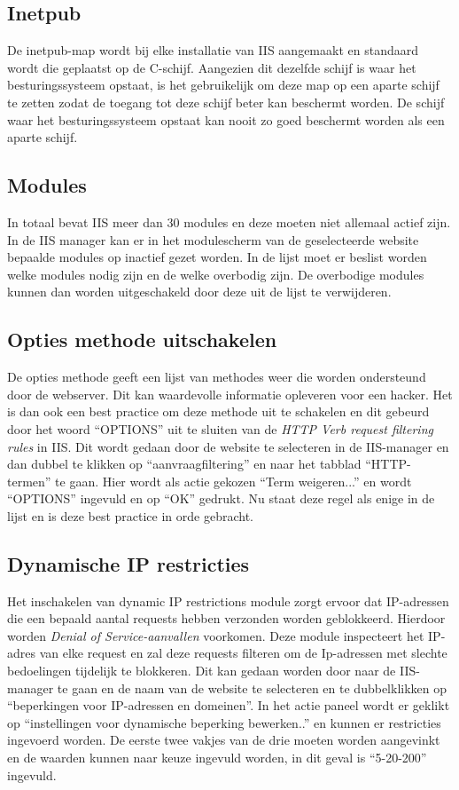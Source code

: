 \documentclass[pdftex,a4paper,12pt]{report}
\begin{document}
\subsection{Inetpub}
De inetpub-map wordt bij elke installatie van IIS aangemaakt en standaard wordt die geplaatst op de C-schijf. Aangezien dit dezelfde schijf is waar het besturingssysteem opstaat, is het gebruikelijk om deze map op een aparte schijf te zetten zodat de toegang tot deze schijf beter kan beschermt worden. De schijf waar het besturingssysteem opstaat kan nooit zo goed beschermt worden als een aparte schijf. \citep{Microsoft2013}

\subsection{Modules}
In totaal bevat IIS meer dan 30 modules en deze moeten niet allemaal actief zijn. In de IIS manager kan er in het modulescherm van de geselecteerde website bepaalde modules op inactief gezet worden. In de lijst moet er beslist worden welke modules nodig zijn en de welke overbodig zijn. De overbodige modules kunnen dan worden uitgeschakeld door deze uit de lijst te verwijderen. 

\subsection{Opties methode uitschakelen}
De opties methode geeft een lijst van methodes weer die worden ondersteund door de webserver. Dit kan waardevolle informatie opleveren voor een hacker. Het is dan ook een best practice om deze methode uit te schakelen en dit gebeurd door het woord "`OPTIONS"' uit te sluiten van de \textit{HTTP Verb request filtering rules} in IIS. Dit wordt gedaan door de website te selecteren in de IIS-manager en dan dubbel te klikken op "`aanvraagfiltering"' en naar het tabblad "`HTTP-termen"' te gaan. Hier wordt als actie gekozen "`Term weigeren..."' en wordt "`OPTIONS"' ingevuld en op "`OK"' gedrukt. Nu staat deze regel als enige in de lijst en is deze best practice in orde gebracht.

\subsection{Dynamische IP restricties}
Het inschakelen van dynamic IP restrictions module zorgt ervoor dat IP-adressen die een bepaald aantal requests hebben verzonden worden geblokkeerd. Hierdoor worden \textit{Denial of Service-aanvallen} voorkomen. Deze module inspecteert het IP-adres van elke request en zal deze requests filteren om de Ip-adressen met slechte bedoelingen tijdelijk te blokkeren. Dit kan gedaan worden door naar de IIS-manager te gaan en de naam van de website te selecteren en te dubbelklikken op "`beperkingen voor IP-adressen en domeinen"'. In het actie paneel wordt er geklikt op "`instellingen voor dynamische beperking bewerken.."' en kunnen er restricties ingevoerd worden. De eerste twee vakjes van de drie moeten worden aangevinkt en de waarden kunnen naar keuze ingevuld worden, in dit geval is "`5-20-200"' ingevuld. 
\end{document}
